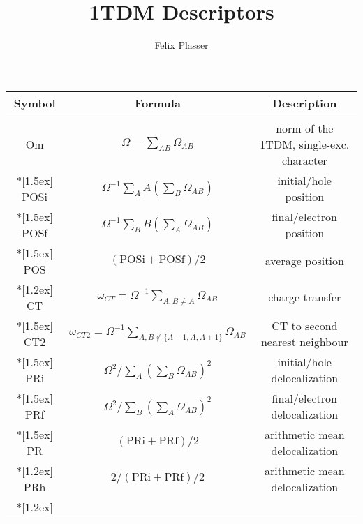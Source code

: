 \documentclass[12pt,a4paper]{report}
\author{Felix Plasser}
\title{1TDM Descriptors}
\begin{document}
\begin{tabular}{ccc}
\hline 
\textbf{Symbol} & \textbf{Formula} & \textbf{Description} \\ 
\hline
\\
Om & $\Omega = \sum_{AB}\Omega_{AB}$ & norm of the 1TDM, single-exc. character \\*[1.5ex]
POSi & $\Omega^{-1}\sum_A A\left(\sum_B \Omega_{AB}\right)$ & initial/hole position	 \\*[1.5ex]
POSf & $\Omega^{-1}\sum_B B\left(\sum_A \Omega_{AB}\right)$ & final/electron position	 \\*[1.5ex]
POS & $(\textrm{POSi} + \textrm{POSf})/2$ & average position \\*[1.2ex]
CT  & $\omega_{CT}=\Omega^{-1}\sum_{A,B\neq A}\Omega_{AB}$ & charge transfer \\*[1.5ex]
CT2  & $\omega_{CT2}=\Omega^{-1}\sum_{A,B\not\in \lbrace A-1,A,A+1\rbrace}\Omega_{AB}$ & CT to second nearest neighbour \\*[1.5ex]
PRi & $\Omega^{2}/\sum_A\left(\sum_B \Omega_{AB}\right)^2$ & initial/hole delocalization \\*[1.5ex]
PRf & $\Omega^{2}/\sum_B\left(\sum_A \Omega_{AB}\right)^2$ & final/electron delocalization \\*[1.5ex]
PR & $(\textrm{PRi}+\textrm{PRf})/2$ & arithmetic mean delocalization\\*[1.2ex]
PRh & $2/(\textrm{PRi}+\textrm{PRf})/2$ & arithmetic mean delocalization\\*[1.2ex]
\hline 
\end{tabular} 
\end{document}
